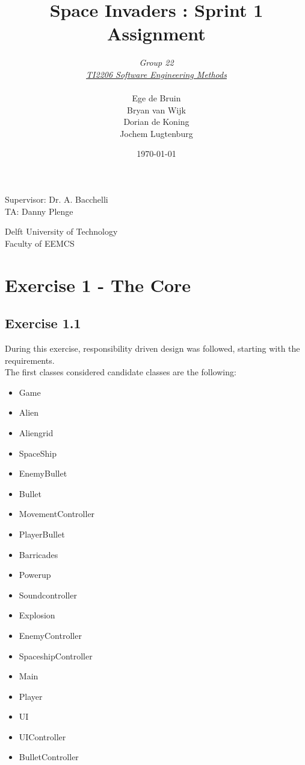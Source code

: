 \documentclass[10pt]{article}
\begin{document}
\title{Space Invaders : Sprint 1 Assignment}
\date{\today}
\author{\textit{Group 22}\\ \textit{\underline{TI2206 Software Engineering Methods}} \\
 \\Ege de Bruin \\ Bryan van Wijk \\ Dorian de Koning \\ Jochem Lugtenburg }
 \maketitle  
 \begin{center}
Supervisor: Dr. A. Bacchelli\\
TA: Danny Plenge\\
 \end{center}     
 \begin{center}
 Delft University of Technology\\
 Faculty of EEMCS\\
 \end{center}
 \thispagestyle{empty}
 \pagebreak
 
\section{Exercise 1 - The Core}

 \subsection*{Exercise 1.1}

During this exercise, responsibility driven design was followed, starting with the requirements.\\
The first classes considered candidate classes are the following:
\begin{itemize}
  \item Game
  \item Alien
  \item Aliengrid
  \item SpaceShip
  \item EnemyBullet
\item Bullet
\item MovementController
\item PlayerBullet
\item Barricades
\item Powerup
\item Soundcontroller
\item Explosion
\item EnemyController
\item SpaceshipController
\item Main
\item Player
\item UI
\item UIController
\item BulletController

\end{itemize}
\end{document}
